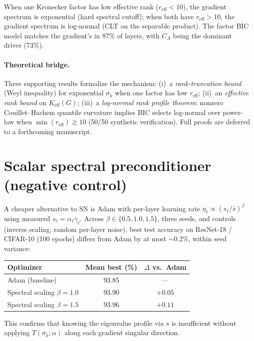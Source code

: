 \documentclass{article}
\begin{document}
\noindent When one Kronecker factor has low effective rank ($r_{\mathrm{eff}} < 10$), the gradient spectrum is exponential (hard spectral cutoff); when both have $r_{\mathrm{eff}} > 10$, the gradient spectrum is log-normal (CLT on the separable product). The factor BIC model matches the gradient's in 87\% of layers, with $C_A$ being the dominant driver (73\%).

\paragraph{Theoretical bridge.}
Three supporting results formalize the mechanism: (i)~a \emph{rank-truncation bound} (Weyl inequality) for exponential $\sigma_k$ when one factor has low $r_{\mathrm{eff}}$; (ii)~an \emph{effective rank bound} on $K_{\mathrm{eff}}(G)$; (iii)~a \emph{log-normal rank profile theorem}: nonzero Couillet--Hachem quantile curvature implies BIC selects log-normal over power-law when $\min(r_{\mathrm{eff}}) \gtrsim 10$ (50/50 synthetic verification). Full proofs are deferred to a forthcoming manuscript.

\section{Scalar spectral preconditioner (negative control)}\label{app:scalar-precond}

A cheaper alternative to SN is Adam with per-layer learning rate $\eta_\ell \propto (s_\ell / \bar{s})^\beta$ using measured $s_\ell = \alpha_\ell \gamma_\ell$. Across $\beta \in \{0.5, 1.0, 1.5\}$, three seeds, and controls (inverse scaling, random per-layer noise), best test accuracy on ResNet-18 / CIFAR-10 (100 epochs) differs from Adam by at most $\sim$0.2\%, within seed variance:

\begin{center}
\small
\begin{tabular}{lcc}
\toprule
\textbf{Optimizer} & Mean best (\%) & $\Delta$ vs.\ Adam \\
\midrule
Adam (baseline) & 93.85 & --- \\
Spectral scaling $\beta{=}1.0$ & 93.90 & $+0.05$ \\
Spectral scaling $\beta{=}1.5$ & 93.96 & $+0.11$ \\
\bottomrule
\end{tabular}
\end{center}

\noindent This confirms that knowing the eigenvalue profile via $s$ is insufficient without applying $T(\sigma_k;\alpha)$ along each gradient singular direction.
\end{document}
